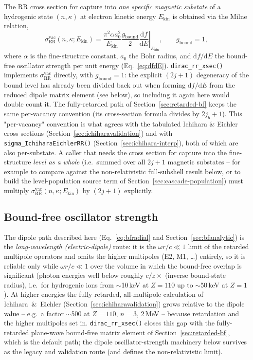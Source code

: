 \documentclass[11pt,a4paper]{article}
\newcommand{\dif}{\mathrm{d}}
\begin{document}
The RR cross section for capture into \emph{one specific magnetic
substate} of a hydrogenic state $(n,\kappa)$ at electron kinetic energy
$E_{\mathrm{kin}}$ is obtained via the Milne relation,
\begin{equation}
  \sigma_{\mathrm{RR}}^{\mathrm{vac}}(n,\kappa; E_{\mathrm{kin}})
  = \frac{\pi^{2}\alpha a_{0}^{2}}{E_{\mathrm{kin}}}
    \frac{g_{\mathrm{bound}}}{2}
    \left.\frac{\dif f}{\dif E}\right|_{E_{\mathrm{kin}}},
  \qquad g_{\mathrm{bound}} = 1,
  \label{eq:milne}
\end{equation}
where $\alpha$ is the fine-structure constant, $a_{0}$ the Bohr radius,
and $\dif f/\dif E$ the bound-free oscillator strength per unit energy
(Eq.~\ref{eq:dfdE}). {\tt dirac\_rr\_xsec()} implements
$\sigma_{\mathrm{RR}}^{\mathrm{vac}}$ directly, with $g_{\mathrm{bound}}=1$:
the explicit $(2j+1)$ degeneracy of the bound level has already been
divided back out when forming $\dif f/\dif E$ from the reduced dipole
matrix element (see below), so including it again here would double
count it.  The fully-retarded path of
Section~\ref{sec:retarded-bf} keeps the same per-vacancy convention
(its cross-section formula divides by $2j_{b}+1$).  This
"per-vacancy" convention is what agrees with the tabulated
Ichihara \& Eichler cross sections (Section~\ref{sec:ichiharavalidation})
and with {\tt sigma\_IchiharaEichlerRR()}
(Section~\ref{sec:ichihara-interp}), both of which are also per-substate.
A caller that needs the cross section for capture into the fine-structure
\emph{level as a whole} (i.e.\ summed over all $2j+1$ magnetic substates
-- for example to compare against the non-relativistic full-subshell
result below, or to build the level-population source term of
Section~\ref{sec:cascade-population}) must multiply
$\sigma_{\mathrm{RR}}^{\mathrm{vac}}(n,\kappa;E_{\mathrm{kin}})$ by
$(2j+1)$ explicitly.

\subsection{Bound-free oscillator strength}

The dipole path described here (Eq.~\ref{eq:bfradial} and
Section~\ref{sec:bfanalytic}) is the \emph{long-wavelength
(electric-dipole)} route: it is the $\omega r/c \ll 1$ limit of the
retarded multipole operators and omits the higher multipoles (E2, M1,
\dots) entirely, so it is reliable only while $\omega r/c \ll 1$ over the
volume in which the bound-free overlap is significant (photon energies
well below roughly $c/z \times$ (inverse bound-state radius), i.e.\ for
hydrogenic ions from $\sim$10\,keV at $Z=110$ up to $\sim$50\,keV at
$Z=1$).  At higher energies the fully retarded, all-multipole calculation
of Ichihara~\&~Eichler (Section~\ref{sec:ichiharavalidation}) grows
relative to the dipole value -- e.g.\ a factor $\sim$500 at $Z=110$,
$n=3$, 2\,MeV -- because retardation and the higher multipoles set in.
{\tt dirac\_rr\_xsec()} closes this gap with the fully-retarded
plane-wave bound-free matrix element of
Section~\ref{sec:retarded-bf}, which is the default path; the dipole
oscillator-strength machinery below survives as the legacy and
validation route (and defines the non-relativistic limit).
\end{document}
